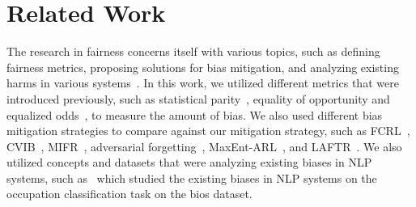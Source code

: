 \section{Related Work}
 The research in fairness concerns itself with various topics, such as defining fairness metrics, proposing solutions for bias mitigation, and analyzing existing harms in various systems~\cite{10.1145/3457607}. In this work, we utilized different metrics that were introduced previously, such as statistical parity~\cite{Dwork:2012:FTA:2090236.2090255}, equality of opportunity and equalized odds~\cite{NIPS2016_9d268236}, to measure the amount of bias. We also used different bias mitigation strategies to compare against our mitigation strategy, such as FCRL~\cite{gupta2021controllable}, CVIB~\cite{NEURIPS2018_415185ea}, MIFR~\cite{pmlr-v89-song19a}, adversarial forgetting~\cite{advforg}, MaxEnt-ARL~\cite{roy2019mitigating}, and LAFTR~\cite{pmlr-v80-madras18a}.  We also utilized concepts and datasets that were analyzing existing biases in NLP systems, such as~\cite{de2019bias} which studied the existing biases in NLP systems on the occupation classification task on the bios dataset.

